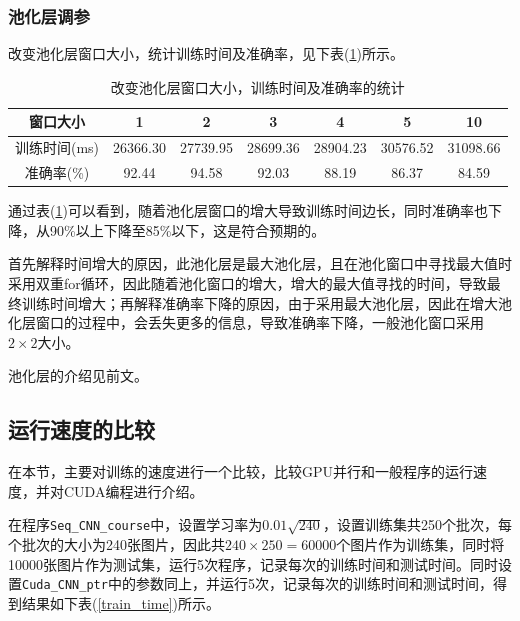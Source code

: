 \documentclass[UTF-8, a4paper, 12pt]{ctexart}
\begin{document}
\subsubsection{池化层调参}

改变池化层窗口大小，统计训练时间及准确率，见下表(\ref{pool})所示。

\begin{table}[htbp]
    \centering
    \caption{改变池化层窗口大小，训练时间及准确率的统计}
    \label{pool}
    \begin{tabular}{c|cccccc}
        \hline
        窗口大小&1&2&3&4&5&10\\
        \hline
        训练时间(ms)&26366.30&27739.95&28699.36&28904.23&30576.52&31098.66\\
        准确率(\%)&92.44&94.58&92.03&88.19&86.37&84.59\\
        \hline
    \end{tabular}
    
\end{table}

通过表(\ref{pool})可以看到，随着池化层窗口的增大导致训练时间边长，同时准确率也下降，从90\%以上下降至85\%以下，这是符合预期的。

首先解释时间增大的原因，此池化层是最大池化层，且在池化窗口中寻找最大值时采用双重for循环，因此随着池化窗口的增大，增大的最大值寻找的时间，导致最终训练时间增大；再解释准确率下降的原因，由于采用最大池化层，因此在增大池化层窗口的过程中，会丢失更多的信息，导致准确率下降，一般池化窗口采用$2\times 2$大小。

池化层的介绍见前文。

\subsection{运行速度的比较}

在本节，主要对训练的速度进行一个比较，比较GPU并行和一般程序的运行速度，并对CUDA编程进行介绍。


在程序\colorbox[gray]{0.9}{\texttt{Seq\_CNN\_course}}中，设置学习率为$0.01\sqrt{240}$，设置训练集共250个批次，每个批次的大小为240张图片，因此共$240\times 250=60000$个图片作为训练集，同时将10000张图片作为测试集，运行5次程序，记录每次的训练时间和测试时间。同时设置\colorbox[gray]{0.9}{\texttt{Cuda\_CNN\_ptr}}中的参数同上，并运行5次，记录每次的训练时间和测试时间，得到结果如下表(\ref{train_time})所示。
\end{document}
